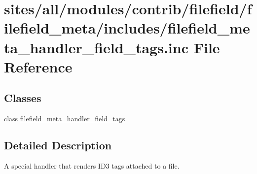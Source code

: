\hypertarget{filefield__meta__handler__field__tags_8inc}{
\section{sites/all/modules/contrib/filefield/filefield\_\-meta/includes/filefield\_\-meta\_\-handler\_\-field\_\-tags.inc File Reference}
\label{filefield__meta__handler__field__tags_8inc}
}
\subsection*{Classes}
\begin{CompactItemize}
\item 
class \hyperlink{classfilefield__meta__handler__field__tags}{filefield\_\-meta\_\-handler\_\-field\_\-tags}
\end{CompactItemize}


\subsection{Detailed Description}
A special handler that renders ID3 tags attached to a file. 
